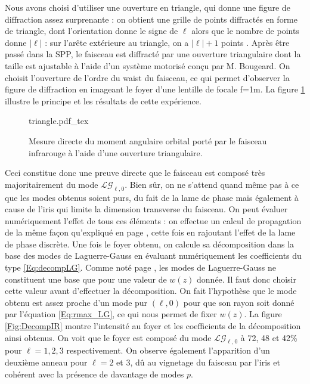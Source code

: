 Nous avons choisi d'utiliser une ouverture en triangle, qui donne une figure de diffraction assez surprenante : on obtient une grille de points diffractés en forme de triangle, dont l'orientation donne le  signe de $\ell$ alors que le nombre de points donne $\left|\ell\right|$ : sur l'arête extérieure au triangle, on a $\left|\ell\right|+1$ points . Après être passé dans la SPP, le faisceau est diffracté par une ouverture triangulaire dont la taille est ajustable à l'aide d'un système motorisé conçu par M. Bougeard. On choisit l'ouverture de l'ordre du waist du faisceau, ce qui permet d'observer la figure de diffraction en imageant le foyer d'une lentille de focale f=1m. La figure \ref{Fig:Triangle} illustre le principe et les résultats de cette expérience. 

\begin{figure}[!ht]
\centering
\def\svgwidth{1.0\columnwidth}
{triangle.pdf_tex}
\caption{Mesure directe du moment angulaire orbital porté par le faisceau infrarouge à l'aide d'une ouverture triangulaire.}
\label{Fig:Triangle}
\end{figure}

Ceci constitue donc une preuve directe que le faisceau est composé très majoritairement du mode $\mathcal{LG}_{\ell,0}$. Bien sûr, on ne s'attend quand même pas à ce que les modes obtenus soient purs, du fait de la lame de phase mais également à cause de l'iris qui limite la dimension transverse du faisceau. On peut évaluer numériquement l'effet de tous ces éléments : on effectue un calcul de propagation de la même façon qu'expliqué en page \pageref{Fig:IrisScan}, cette fois en rajoutant l'effet de la lame de phase discrète. Une fois le foyer obtenu, on calcule sa décomposition dans la base des modes de Laguerre-Gauss en évaluant numériquement les coefficients du type \ref{Eq:decompLG}. Comme noté page \pageref{Eq:rmax_LG}, les modes de Laguerre-Gauss ne constituent une base que pour une valeur de $w(z)$ donnée. Il faut donc choisir cette valeur avant d'effectuer la décomposition. On fait l'hypothèse que le mode obtenu est assez proche d'un mode pur $(\ell,0)$ pour que son rayon soit donné par l'équation \ref{Eq:rmax_LG}, ce qui nous permet de fixer $w(z)$. La figure \ref{Fig:DecompIR} montre l'intensité au foyer et les coefficients de la décomposition ainsi obtenus. On voit que le foyer est composé du mode $\mathcal{LG}_{\ell,0}$ à 72, 48 et 42\% pour $\ell=1,2,3$ respectivement. On observe également l'apparition d'un deuxième anneau pour $\ell =2$ et 3, dû au vignetage du faisceau par l'iris et cohérent avec la présence de davantage de modes $p$. \par

